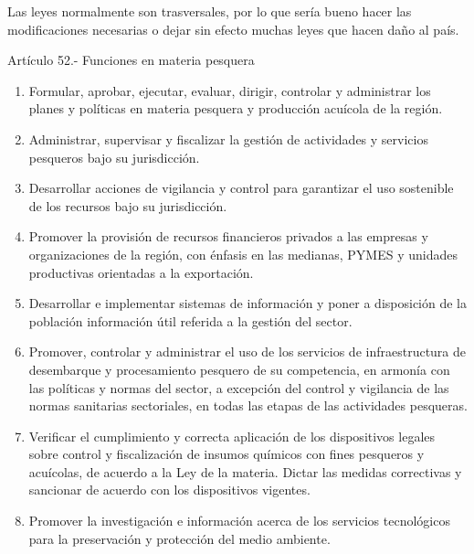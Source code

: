\documentclass[
  jou,
  floatsintext,
  longtable,
  a4paper,
  nolmodern,
  notxfonts,
  notimes,
  12pt,
  colorlinks=true,linkcolor=blue,citecolor=blue,urlcolor=blue]{apa7}
\providecommand{\tightlist}{%
  \setlength{\itemsep}{0pt}\setlength{\parskip}{0pt}}
\begin{document}
Las leyes normalmente son trasversales, por lo que sería bueno hacer las
modificaciones necesarias o dejar sin efecto muchas leyes que hacen daño
al país.

Artículo 52.- Funciones en materia pesquera

\begin{enumerate}
\def\labelenumi{\alph{enumi})}
\tightlist
\item
  Formular, aprobar, ejecutar, evaluar, dirigir, controlar y administrar
  los planes y políticas en materia pesquera y producción acuícola de la
  región.
\item
  Administrar, supervisar y fiscalizar la gestión de actividades y
  servicios pesqueros bajo su jurisdicción.
\item
  Desarrollar acciones de vigilancia y control para garantizar el uso
  sostenible de los recursos bajo su jurisdicción.
\item
  Promover la provisión de recursos financieros privados a las empresas
  y organizaciones de la región, con énfasis en las medianas, PYMES y
  unidades productivas orientadas a la exportación.
\item
  Desarrollar e implementar sistemas de información y poner a
  disposición de la población información útil referida a la gestión del
  sector.
\item
  Promover, controlar y administrar el uso de los servicios de
  infraestructura de desembarque y procesamiento pesquero de su
  competencia, en armonía con las políticas y normas del sector, a
  excepción del control y vigilancia de las normas sanitarias
  sectoriales, en todas las etapas de las actividades pesqueras.
\item
  Verificar el cumplimiento y correcta aplicación de los dispositivos
  legales sobre control y fiscalización de insumos químicos con fines
  pesqueros y acuícolas, de acuerdo a la Ley de la materia. Dictar las
  medidas correctivas y sancionar de acuerdo con los dispositivos
  vigentes.
\item
  Promover la investigación e información acerca de los servicios
  tecnológicos para la preservación y protección del medio ambiente.
\end{enumerate}
\end{document}
